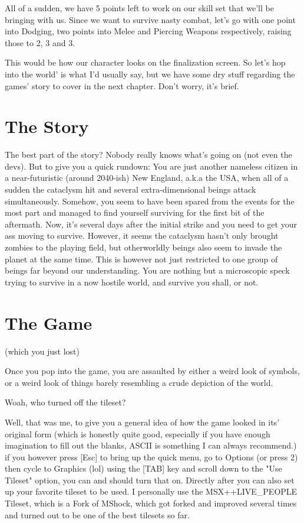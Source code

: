 \documentclass[11pt]{report}
\begin{document}
All of a sudden, we have 5 points left to work on our skill set that we'll be bringing with us. Since we want to survive nasty combat, let's go with one point into Dodging, two points into Melee and Piercing Weapons respectively, raising those to 2, 3 and 3.


This would be how our character looks on the finalization screen. So let's hop into the world' is what I'd usually say, but we have some dry stuff regarding the games' story to cover in the next chapter. Don't worry, it's brief.

\chapter{The Story}

The best part of the story? Nobody really knows what's going on (not even the devs). But to give you a quick rundown: You are just another nameless citizen in a near-futuristic (around 2040-ish) New England, a.k.a the USA, when all of a sudden the cataclysm hit and several extra-dimensional beings attack simultaneously. Somehow, you seem to have been spared from the events for the most part and managed to find yourself surviving for the first bit of the aftermath. Now, it's several days after the initial strike and you need to get your ass moving to survive. However, it seems the cataclysm hasn't only brought zombies to the playing field, but otherworldly beings also seem to invade the planet at the same time. This is however not just restricted to one group of beings far beyond our understanding. You are nothing but a microscopic speck trying to survive in a now hostile world, and survive you shall, or not.

\chapter{The Game}
(which you just lost)

Once you pop into the game, you are assaulted by either a weird look of symbols, or a weird look of things barely resembling a crude depiction of the world.


Woah, who turned off the tileset?

Well, that was me, to give you a general idea of how the game looked in its' original form (which is honestly quite good, especially if you have enough imagination to fill out the blanks, ASCII is something I can always recommend.) if you however press [Esc] to bring up the quick menu, go to Options (or press 2) then cycle to Graphics (lol) using the [TAB] key and scroll down to the "Use Tileset" option, you can and should turn that on. Directly after you can also set up your favorite tileset to be used. I personally use the MSX++LIVE\_PEOPLE Tileset, which is a Fork of MShock, which got forked and improved several times and turned out to be one of the best tilesets so far.
\end{document}
